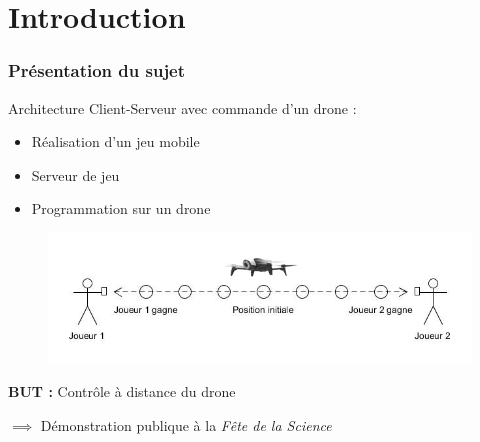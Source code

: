 \section{Introduction}
\begin{frame}
\frametitle{Présentation du sujet}
Architecture Client-Serveur avec commande d'un drone : 
\begin{itemize}
\item Réalisation d'un jeu mobile
\item Serveur de jeu
\item Programmation sur un drone
\end{itemize}
\begin{center}
\begin{figure}
\includegraphics[scale=0.4]{images/partie.jpg}
\end{figure}
\end{center}

\textbf{BUT :} Contrôle à distance du drone

$\implies$ Démonstration publique à la \textit{Fête de la Science}
\end{frame}

